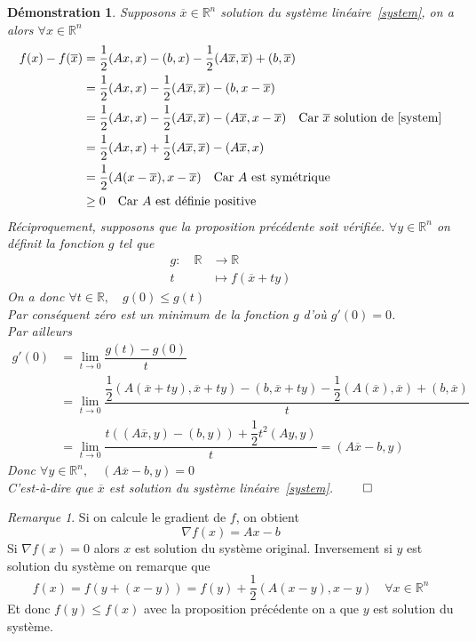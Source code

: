 \documentclass[twoside,12pt]{report}
\newtheorem*{dem*}{Démonstration}
\theoremstyle{remark}
\newtheorem*{rem*}{Remarque}
\begin{document}
\begin{dem*}
Supposons $\overline{x}\in \mathbb{R}^n$ solution du système linéaire~\eqref{system}, on a alors $\forall x \in \mathbb{R}^n$
\begin{align*}
f(x) -f(\overline{x})&=\dfrac{1}{2}(Ax,x)-(b,x)-\dfrac{1}{2}(A\overline{x},\overline{x})+(b,\overline{x}) \\
&=\dfrac{1}{2}(Ax,x)-\dfrac{1}{2}(A\overline{x},\overline{x})-(b,x-\overline{x}) \\
&=\dfrac{1}{2}(Ax,x)-\dfrac{1}{2}(A\overline{x},\overline{x})-(A\overline{x},x-\overline{x}) \quad \mbox{Car $\overline{x}$ solution de~\eqref{system}} \\
&=\dfrac{1}{2}(Ax,x)+\dfrac{1}{2}(A\overline{x},\overline{x})-(A\overline{x},x) \\
&=\dfrac{1}{2}(A(x-\overline{x}),x-\overline{x}) \quad \mbox{Car $A$ est symétrique} \\
&\geq 0 \quad \mbox{Car $A$ est définie positive}
\end{align*}
Réciproquement, supposons que la proposition précédente soit vérifiée. $\forall y \in \mathbb{R}^n$ on définit la fonction $g$ tel que
\begin{align*}
g :\quad \mathbb{R} &\to \mathbb{R} \\
t &\mapsto f(\overline{x}+ty)
\end{align*}
On a donc $\forall t \in \mathbb{R}, \quad g(0) \leq g(t)$\\
Par conséquent zéro est un minimum de la fonction $g$ d'où $g'(0)=0$.\\
Par ailleurs
\begin{align*}
g'(0)&=\lim\limits_{t \rightarrow 0}\dfrac{g(t)-g(0)}{t} \\
&=\lim\limits_{t \rightarrow 0} \dfrac{\dfrac{1}{2}(A(\overline{x}+ty),\overline{x}+ty)-(b,\overline{x}+ty)-\dfrac{1}{2}(A(\overline{x}),\overline{x})+(b,\overline{x})}{t} \\
&=\lim\limits_{t \rightarrow 0} \dfrac{t( (A\overline{x},y)-(b,y))+\dfrac{1}{2}t^2(Ay,y)}{t}=(A\overline{x}-b,y)
\end{align*}
Donc $\forall y \in \mathbb{R}^n, \quad (A\overline{x}-b,y)=0$\\
C'est-à-dire que $\overline{x}$ est solution du système linéaire~\eqref{system}.\hspace{6.5cm} $\qed$
\end{dem*}
\begin{rem*}
Si on calcule le gradient de $f$, on obtient
\begin{equation}
\nabla f(x)=Ax-b \label{gradf}
\end{equation}
Si $\nabla f(x)=0$ alors $x$ est solution du système original. Inversement si $y$ est solution du système on remarque que
\begin{equation*}
f(x)=f(y+(x-y))=f(y)+\dfrac{1}{2}(A(x-y),x-y) \quad \forall x\in \mathbb{R}^n
\end{equation*}
Et donc $f(y) \leq f(x)$ avec la proposition précédente on a que $y$ est solution du système.
\end{rem*}
\end{document}
